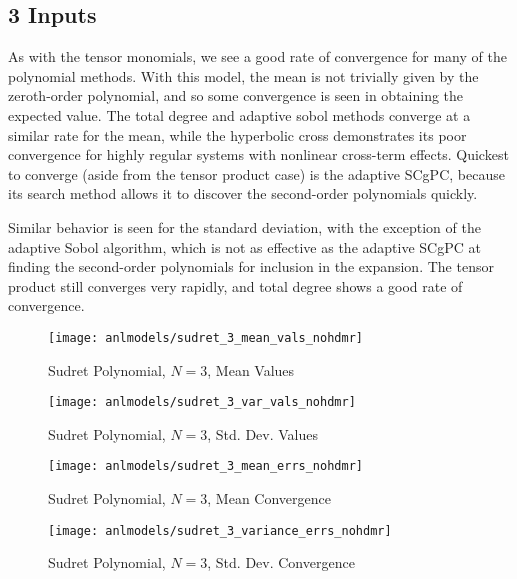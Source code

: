 \subsection{3 Inputs}
As with the tensor monomials, we see a good rate of convergence for many of the polynomial methods.  With
this model, the mean is not trivially given by the zeroth-order polynomial, and so some convergence is seen
in obtaining the expected value.  The total degree and adaptive sobol methods converge at a similar rate for
the mean, while the hyperbolic cross demonstrates its poor convergence for highly regular systems with
nonlinear cross-term effects.  Quickest to converge (aside from the tensor product case) is the adaptive
SCgPC, because its search method allows it to discover the second-order polynomials quickly.

Similar behavior is seen for the standard deviation, with the exception of the adaptive Sobol algorithm, which
is not as effective as the adaptive SCgPC at finding the second-order polynomials for inclusion in the expansion.
The tensor product still converges very rapidly, and total degree shows a good rate of convergence.
\begin{figure}[H]
  \centering
  \texttt{[image: anlmodels/sudret\_3\_mean\_vals\_nohdmr]}
  \caption{Sudret Polynomial, $N=3$, Mean Values}
  \label{fig:sudretpoly mean values 3}
\end{figure}
\begin{figure}[H]
  \centering
  \texttt{[image: anlmodels/sudret\_3\_var\_vals\_nohdmr]}
  \caption{Sudret Polynomial, $N=3$, Std. Dev. Values}
  \label{fig:sudretpoly var values 3}
\end{figure}

\begin{figure}[H]
  \centering
  \texttt{[image: anlmodels/sudret\_3\_mean\_errs\_nohdmr]}
  \caption{Sudret Polynomial, $N=3$, Mean Convergence}
  \label{fig:sudretpoly mean errors 3}
\end{figure}
\begin{figure}[H]
  \centering
  \texttt{[image: anlmodels/sudret\_3\_variance\_errs\_nohdmr]}
  \caption{Sudret Polynomial, $N=3$, Std. Dev. Convergence}
  \label{fig:sudretpoly var errors 3}
\end{figure}

